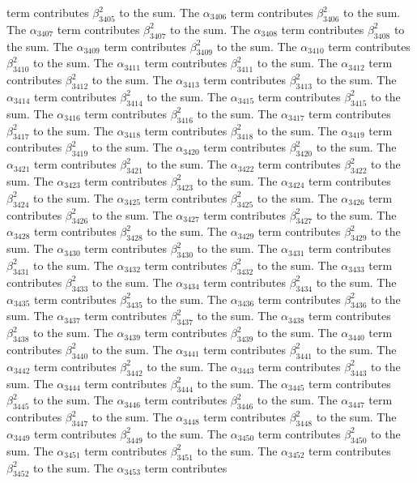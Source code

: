 \begin{lemma}
term contributes $\beta_{3405}^{2}$ to the sum. The $\alpha_{3406}$ term contributes $\beta_{3406}^{2}$ to the sum. The $\alpha_{3407}$ term contributes $\beta_{3407}^{2}$ to the sum. The $\alpha_{3408}$ term contributes $\beta_{3408}^{2}$ to the sum. The $\alpha_{3409}$ term contributes $\beta_{3409}^{2}$ to the sum. The $\alpha_{3410}$ term contributes $\beta_{3410}^{2}$ to the sum. The $\alpha_{3411}$ term contributes $\beta_{3411}^{2}$ to the sum. The $\alpha_{3412}$ term contributes $\beta_{3412}^{2}$ to the sum. The $\alpha_{3413}$ term contributes $\beta_{3413}^{2}$ to the sum. The $\alpha_{3414}$ term contributes $\beta_{3414}^{2}$ to the sum. The $\alpha_{3415}$ term contributes $\beta_{3415}^{2}$ to the sum. The $\alpha_{3416}$ term contributes $\beta_{3416}^{2}$ to the sum. The $\alpha_{3417}$ term contributes $\beta_{3417}^{2}$ to the sum. The $\alpha_{3418}$ term contributes $\beta_{3418}^{2}$ to the sum. The $\alpha_{3419}$ term contributes $\beta_{3419}^{2}$ to the sum. The $\alpha_{3420}$ term contributes $\beta_{3420}^{2}$ to the sum. The $\alpha_{3421}$ term contributes $\beta_{3421}^{2}$ to the sum. The $\alpha_{3422}$ term contributes $\beta_{3422}^{2}$ to the sum. The $\alpha_{3423}$ term contributes $\beta_{3423}^{2}$ to the sum. The $\alpha_{3424}$ term contributes $\beta_{3424}^{2}$ to the sum. The $\alpha_{3425}$ term contributes $\beta_{3425}^{2}$ to the sum. The $\alpha_{3426}$ term contributes $\beta_{3426}^{2}$ to the sum. The $\alpha_{3427}$ term contributes $\beta_{3427}^{2}$ to the sum. The $\alpha_{3428}$ term contributes $\beta_{3428}^{2}$ to the sum. The $\alpha_{3429}$ term contributes $\beta_{3429}^{2}$ to the sum. The $\alpha_{3430}$ term contributes $\beta_{3430}^{2}$ to the sum. The $\alpha_{3431}$ term contributes $\beta_{3431}^{2}$ to the sum. The $\alpha_{3432}$ term contributes $\beta_{3432}^{2}$ to the sum. The $\alpha_{3433}$ term contributes $\beta_{3433}^{2}$ to the sum. The $\alpha_{3434}$ term contributes $\beta_{3434}^{2}$ to the sum. The $\alpha_{3435}$ term contributes $\beta_{3435}^{2}$ to the sum. The $\alpha_{3436}$ term contributes $\beta_{3436}^{2}$ to the sum. The $\alpha_{3437}$ term contributes $\beta_{3437}^{2}$ to the sum. The $\alpha_{3438}$ term contributes $\beta_{3438}^{2}$ to the sum. The $\alpha_{3439}$ term contributes $\beta_{3439}^{2}$ to the sum. The $\alpha_{3440}$ term contributes $\beta_{3440}^{2}$ to the sum. The $\alpha_{3441}$ term contributes $\beta_{3441}^{2}$ to the sum. The $\alpha_{3442}$ term contributes $\beta_{3442}^{2}$ to the sum. The $\alpha_{3443}$ term contributes $\beta_{3443}^{2}$ to the sum. The $\alpha_{3444}$ term contributes $\beta_{3444}^{2}$ to the sum. The $\alpha_{3445}$ term contributes $\beta_{3445}^{2}$ to the sum. The $\alpha_{3446}$ term contributes $\beta_{3446}^{2}$ to the sum. The $\alpha_{3447}$ term contributes $\beta_{3447}^{2}$ to the sum. The $\alpha_{3448}$ term contributes $\beta_{3448}^{2}$ to the sum. The $\alpha_{3449}$ term contributes $\beta_{3449}^{2}$ to the sum. The $\alpha_{3450}$ term contributes $\beta_{3450}^{2}$ to the sum. The $\alpha_{3451}$ term contributes $\beta_{3451}^{2}$ to the sum. The $\alpha_{3452}$ term contributes $\beta_{3452}^{2}$ to the sum. The $\alpha_{3453}$ term contributes 
\end{lemma}

